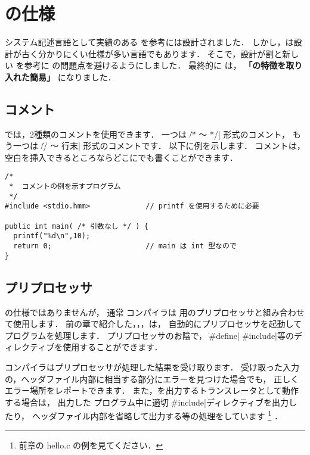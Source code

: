 % 
%
\chapter{\cmml の仕様}

システム記述言語として実績のある \cl を参考に\cmml は設計されました．
しかし，\cl は設計が古く分かりにくい仕様が多い言語でもあります．
そこで，設計が割と新しい \javal を参考に \cl の問題点を避けるようにしました．
最終的に \cmml は，
{\bf 「\javal の特徴を取り入れた簡易\cl」} になりました．

\section{コメント}

\cmml では，2種類のコメントを使用できます．
一つは \|/* 〜 */| 形式のコメント，
もう一つは \|// 〜 行末| 形式のコメントです．
以下に例を示します．
コメントは，空白を挿入できるところならどこにでも書くことができます．

\begin{mylist}
\begin{verbatim}
/*
 *  コメントの例を示すプログラム
 */
#include <stdio.hmm>             // printf を使用するために必要

public int main( /* 引数なし */ ) {
  printf("%d\n",10);
  return 0;                      // main は int 型なので
}
\end{verbatim}
\end{mylist}

\section{プリプロセッサ}

\cmml の仕様ではありませんが，
通常 \cmm コンパイラは \cl 用のプリプロセッサと組み合わせて使用します．
前の章で紹介した{\cme}，{\cmc}，{\cmi}，{\cmv}は，
自動的にプリプロセッサを起動して{\cmm}プログラムを処理します．
プリプロセッサのお陰で，
\|#define|，\|#include|等のディレクティブを使用することができます．

\cmm コンパイラはプリプロセッサが処理した結果を受け取ります．
受け取った入力の，ヘッダファイル内部に相当する部分にエラーを見つけた場合でも，
正しくエラー場所をレポートできます．
また，\cl を出力するトランスレータとして動作する場合は，
出力した \cl プログラム中に適切な\|#include|ディレクティブを出力したり，
ヘッダファイル内部を省略して出力する等の処理をしています
\footnote{前章の hello.c の例を見てください．}
．

